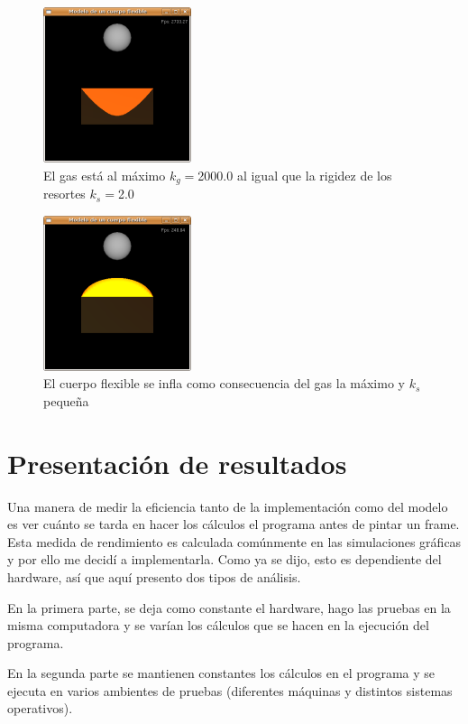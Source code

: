 \begin{figure}
 \centering
 \includegraphics[]{Img/modRes5}
 \caption[Ejecución con fuerza del gas y rigidez al máximo]{El gas está al máximo $k_g=$2000.0 al igual que la rigidez de los resortes $k_s=$2.0}
 \label{res:test5}
\end{figure}

\begin{figure}
 \centering
 \includegraphics[]{Img/modRes6}
 \caption[Ejecución con fuerza del gas y rigidez pequeña]{El cuerpo flexible se infla como consecuencia del gas la máximo y $k_s$ pequeña}
 \label{res:test6}
\end{figure}

\section{Presentación de resultados}

Una manera de medir la eficiencia tanto de la implementación como del modelo es ver cuánto se tarda en hacer los cálculos el programa antes de pintar un frame. 
Esta medida de rendimiento es calculada comúnmente en las simulaciones gráficas y por ello me decidí a implementarla.
Como ya se dijo, esto es dependiente del hardware, así que aquí presento dos tipos de análisis.

En la primera parte, se deja como constante el hardware, hago las pruebas en la misma computadora y se varían los cálculos que se hacen en la ejecución del programa.

En la segunda parte se mantienen constantes los cálculos en el programa y se ejecuta en varios ambientes de pruebas (diferentes máquinas y distintos sistemas operativos).

